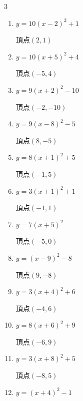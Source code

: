 \begin{multicols}{3}
\begin{enumerate}
        $\displaystyle 頂点\left( -3 , -7 \right)$

  \item $\displaystyle y=10\left( x-2\right)^{2}+1$

        $\displaystyle 頂点\left( 2 , 1 \right)$

  \item $\displaystyle y=10\left( x+5\right)^{2}+4$

        $\displaystyle 頂点\left( -5 , 4 \right)$

  \item $\displaystyle y=9\left( x+2\right)^{2}-10$

        $\displaystyle 頂点\left( -2 , -10 \right)$

  \item $\displaystyle y=9\left( x-8\right)^{2}-5$

        $\displaystyle 頂点\left( 8 , -5 \right)$

  \item $\displaystyle y=8\left( x+1\right)^{2}+5$

        $\displaystyle 頂点\left( -1 , 5 \right)$

  \item $\displaystyle y=3\left( x+1\right)^{2}+1$

        $\displaystyle 頂点\left( -1 , 1 \right)$

  \item $\displaystyle y=7\left( x+5\right)^{2}$

        $\displaystyle 頂点\left( -5 , 0 \right)$

  \item $\displaystyle y=\left( x-9\right)^{2}-8$

        $\displaystyle 頂点\left( 9 , -8 \right)$

  \item $\displaystyle y=3\left( x+4\right)^{2}+6$

        $\displaystyle 頂点\left( -4 , 6 \right)$

  \item $\displaystyle y=8\left( x+6\right)^{2}+9$

        $\displaystyle 頂点\left( -6 , 9 \right)$

  \item $\displaystyle y=3\left( x+8\right)^{2}+5$

        $\displaystyle 頂点\left( -8 , 5 \right)$

  \item $\displaystyle y=\left( x+4\right)^{2}-1$


\end{enumerate}
\end{multicols}
